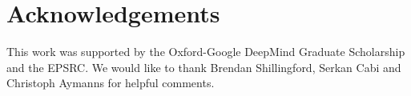 
\section*{Acknowledgements}
This work was supported by the Oxford-Google DeepMind
Graduate Scholarship and the EPSRC. We would like to thank Brendan Shillingford, Serkan Cabi and Christoph Aymanns for helpful comments.
